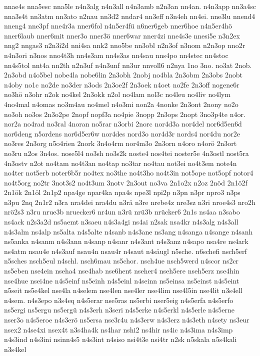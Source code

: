 {nnae4s
nna5esc
nna5le
n4n3alg
n4n3all
n4n3amb
n2n3an
nn4an.
n4n3app
nn3a4sc
nna3s4t
nn3atm
nn3ato
n2nau
nn3d2
nndar4
nn3eff
n3n4eh
nn4ei.
nne3lu
nnend4
nneng4
nne3pf
nne4r3a
nner6fol
n4n5er4fü
n6ner6geb
nner6hoe
n4n5er4hö
nner6laub
nner6mit
nner3o
nner3ö
nner6war
nner4zi
nne4s3e
nnesi5e
n3n2ex
nng2
nngas3
n2n3i2d
nni4sa
nnk2
nno5be
nn3obl
n2n3of
n3nom
n2n3op
nno2r
n4n3ori
n3nos
nno4t3h
nn4s3am
nn4s3as
nn4sau
nns4po
nn4stec
nn4stoc
nn4s5tol
nnt4a
nn2th
n2n3uf
n4n3unf
nn3ur
nnvoll6
n2nya
1no
3no.
no3at
2nob.
2n3obd
n4o5bel
nobe4la
nobe6lin
2n3obh
2nobj
no4bla
2n3obm
2n3obs
2nobt
n4oby
no1c
no2de
no3der
n3ods
2n3oe2f
2n3oek
n4oet
no2fe
2n3off
nogene6r
no3hö
n3ohr
n2ok
no4kel
2n3okk
n2ol
no4lam
nol3c
no4leu
no4liv
no4lym
4no4mal
n4omas
no3m4au
no4mel
n4o3mi
non2a
4nonke
2n3ont
2nony
no2o
no3oh
no3os
2n3o2pe
2nopf
nopf3a
no4pie
3nopp
2n3ops
2nopt
3no3p4te
n4or.
nor2a
no4rad
no3ral
4noran
no5rar
n3orbi
2norc
nor4d3a
nor4del
nor6d5en6d
nor6deng
n5ordens
nor6d5er6w
nor4des
nord3o
nor4d3r
nords4
nor4du
nor2e
no3res
2n3org
n5o4rien
2nork
3n4o4rm
nor4m3o
2n3orn
n4oro
n4orö
2n3ort
no3ru
n2os
3n4os.
nose5l4
no3sh
no3s2k
noste4
nos4tei
noster5e
4n3ostl
nost5ra
4n3ostv
n2ot
no4tam
no4t3an
no4tap
no3tar
no4tau
not3ei
no4t3em
note4n
no4ter
not5erb
noter6b5r
no4tex
no3the
no4t3ho
no4t3in
not5ope
not5opf
notor4
no4t5org
no2tr
3not3s2
no4t3um
3notv
2n3out
no3va
2n1o2x
n2oz
2nöd
2n1ö2f
2n1ök
2n1öl
2n1p2
npa4ge
npar4ka
npa4s
npe3l
npi2p
n3pn
n3pr
npro3
n3ps
n3pu
2nq
2n1r2
n3ra
nra4dei
nra4du
n3rä
n3re
nrebe4z
nre3sz
n3ri
nroe4s3
nro2h
nrö2s3
n3ru
nrue3b
nruecker6
nr4un
n3rü
nrü3b
nrücker6
2n1s
ns4aa
n3sabo
ns4ack
n2s3a2d
ns5aemt
n3saeu
n4s3a4gi
ns4ai
n2sak
nsa4kr
n4s3alg
n4s3all
n4s3alm
ns4alp
ns5alta
n4s5alte
n4sanb
n4s3ane
ns3ang
n4sanga
n4sange
n4sanh
ns5anka
n4sanm
n4s3ann
n4sanp
n4sanr
n4s3ant
n4s3anz
n4sapo
nsa4re
ns4ark
ns4atm
nsau4e
n4s3auf
nsau4n
nsau4r
n4saut
n4säugl
n5sche.
n6schefi
nsch5erf
n5sches
nsch5eul
n4schl.
nsch6mau
ns5chor.
nsch4ue
nsch5werd
n4scor
ns2cr
ns5eben
nse4ein
nseha4
nse4hab
nse6hent
nseher4
nseh5ere
nseh5erz
nse4hin
nse4hue
nsei4ne
n4s5einf
ns5einh
n4s5einl
n4seinn
ns5einsa
ns5einst
n4s5eint
n5seit
ns5e4kel
nse4la
n4selem
nse4len
nse4ler
nse4lim
nse4l5in
nse4lit
n3s4ell
n4sem.
n4s3epo
n3s4eq
n4s5erar
nse5ras
ns5erbi
nser5eig
n4s5erfa
n4s5erfo
ns5ergi
ns5ergu
ns5ergü
n4s3erh
n3seri
n4s5erke
n4s5erkl
n4s5erle
n4s5erne
nser3o
n4s5eroe
n4s3erö
ns5ersa
nse3r4u
n4s3erw
n4s3erz
n4s3eth
n4sety
ns3eur
nsex2
n4se4xi
nsex4t
n3s4ha4k
ns4har
nshi2
ns4hir
ns4ic
n4s3ima
n4s3imp
n4s3ind
n4s3ini
nsinn4s5
n4s3int
n4siso
nsi4t3e
nsi4tr
n2sk
n5skala
n5s4kali
n3s4kel
}
